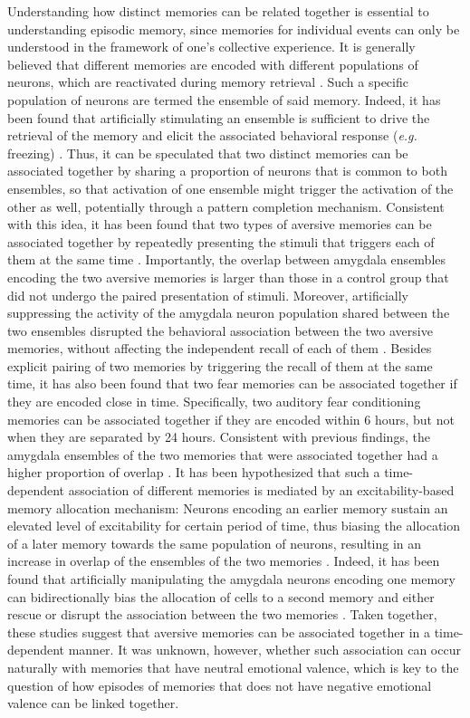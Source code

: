 \documentclass[master.tex]{subfiles}
\begin{document}
Understanding how distinct memories can be related together is essential to
understanding episodic memory, since memories for individual events can only be
understood in the framework of one's collective experience. It is generally
believed that different memories are encoded with different populations of
neurons, which are reactivated during memory retrieval
\cite{tayler_reactivation_2013}. Such a specific population of neurons are
termed the ensemble of said memory. Indeed, it has been found that artificially
stimulating an ensemble is sufficient to drive the retrieval of the memory and
elicit the associated behavioral response (\textit{e.g.} freezing)
\cite{ramirez_creating_2013}. Thus, it can be speculated that two distinct
memories can be associated together by sharing a proportion of neurons that is
common to both ensembles, so that activation of one ensemble might trigger the
activation of the other as well, potentially through a pattern completion
mechanism. Consistent with this idea, it has been found that two types of
aversive memories can be associated together by repeatedly presenting the
stimuli that triggers each of them at the same time
\cite{yokose_overlapping_2017}. Importantly, the overlap between amygdala
ensembles encoding the two aversive memories is larger than those in a control
group that did not undergo the paired presentation of stimuli. Moreover,
artificially suppressing the activity of the amygdala neuron population shared
between the two ensembles disrupted the behavioral association between the two
aversive memories, without affecting the independent recall of each of them
\cite{yokose_overlapping_2017}. Besides explicit pairing of two memories by
triggering the recall of them at the same time, it has also been found that two
fear memories can be associated together if they are encoded close in time.
Specifically, two auditory fear conditioning memories can be associated together
if they are encoded within 6 hours, but not when they are separated by 24 hours.
Consistent with previous findings, the amygdala ensembles of the two memories
that were associated together had a higher proportion of overlap
\cite{rashid_competition_2016}. It has been hypothesized that such a
time-dependent association of different memories is mediated by an
excitability-based memory allocation mechanism: Neurons encoding an earlier
memory sustain an elevated level of excitability for certain period of time,
thus biasing the allocation of a later memory towards the same population of
neurons, resulting in an increase in overlap of the ensembles of the two
memories \cite{lisman_memory_2018, yiu_neurons_2014, zhou_creb_2009}. Indeed, it
has been found that artificially manipulating the amygdala neurons encoding one
memory can bidirectionally bias the allocation of cells to a second memory and
either rescue or disrupt the association between the two memories
\cite{rashid_competition_2016}. Taken together, these studies suggest that
aversive memories can be associated together in a time-dependent manner. It was
unknown, however, whether such association can occur naturally with memories
that have neutral emotional valence, which is key to the question of how
episodes of memories that does not have negative emotional valence can be linked
together.
\end{document}
